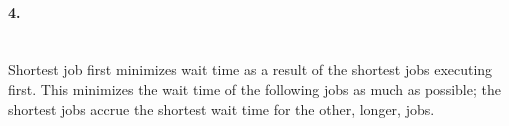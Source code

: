 \documentclass{article}
\begin{document}
\paragraph{4.}\mbox{}\\
Shortest job first minimizes wait time as a result of the shortest jobs executing first. This minimizes the wait time of the following jobs as much as possible; the shortest jobs accrue the shortest wait time for the other, longer, jobs.
\end{document}
